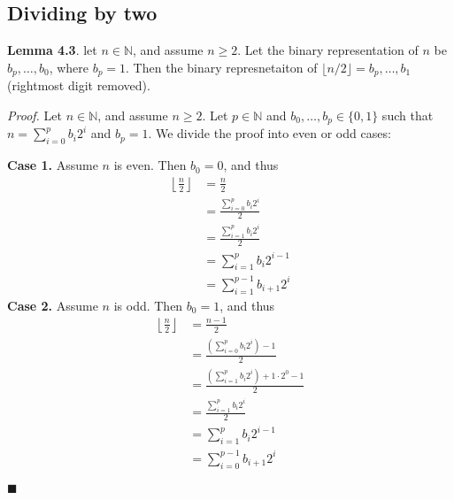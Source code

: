 \documentclass{article}
\newcommand\qedsymbol{\hfill$\blacksquare$}
\begin{document}
\subsection{Dividing by two}
\textbf{Lemma 4.3}. let $n \in \mathbb{N}$, and assume $n \geq 2$. Let the 
binary representation of $n$ be $b_p, \ldots, b_0$, where $b_p = 1$. Then 
the binary represnetaiton of $\lfloor n / 2 \rfloor = b_p, \ldots, b_1$ (rightmost 
digit removed).

\textit{Proof.} Let $n \in \mathbb{N}$, and assume $n \geq 2$. Let $p \in \mathbb{N}$ 
and $b_0, \ldots, b_p \in \{0, 1\}$ such that $n = \sum_{i=0}^{p} b_i 2^i$ and 
$b_p = 1$. We divide the proof into even or odd cases: 

\textbf{Case 1.} Assume $n$ is even. Then $b_0 = 0 $, and thus 
\begin{align*}
    \left\lfloor \frac{n}{2} \right\rfloor &= \frac{n}{2} \\
                                           &= \frac{\sum_{i=0}^{p} b_i 2^i}{2} 
                                           \tag*{since $b_0 = 0$} \\
                                           &= \frac{\sum_{i=1}^{p} b_i 2^i}{2} \\
                                           &= \sum_{i=1}^{p} b_i 2^{i-1} \\
                                           &= \sum_{i=1}^{p-1} b_{i+1} 2^i 
\end{align*}
\textbf{Case 2.} Assume $n$ is odd. Then $b_0 = 1$, and thus 
\begin{align*}
    \left\lfloor \frac{n}{2} \right\rfloor &= \frac{n-1}{2} \\
                                           &= \frac { \left( \sum_{i=0}^{p} b_i 2^i 
                                       \right) -1}{ 2} \\
                                           &= \frac{ \left( \sum_{i=1}^{p} b_i 2^i 
                                               \right) + 1 \cdot 2^0 - 1}{2} \tag*{since
                                               $b_0 = 1$} \\ 
                                           &= \frac{\sum_{i=1}^{p} b_i 2^i}{2} \\
                                           &= \sum_{i=1}^{p} b_i 2^{i-1} \\
                                           &= \sum_{i=0}^{p-1} b_{i+1} 2^i 
\end{align*}

\qedsymbol
\end{document}
